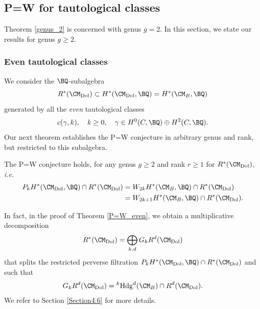 \subsection{P=W for tautological classes}
Theorem \ref{genus_2} is concerned with genus $g=2$.
In this section, we state our results for genus $g \geq  2$.
\subsubsection{Even tautological classes}
We consider the $\BQ$-subalgebra
\[
R^*(\CM_{\mathrm{Dol}})  \subset H^*(\CM_{\mathrm{Dol}}, \BQ)= H^*(\CM_B, \BQ)
\]
generated by all the \emph{even} tautological classes
\[
c(\gamma,k), \quad  k\geq 0, \quad  \gamma \in H^0(C, \BQ)\oplus H^2(C, \BQ).
\]
Our next theorem establishes the P=W conjecture in arbitrary genus and rank, but restricted to this subalgebra.
\begin{thm}
\notready\label{P=W_even}
The P=W conjecture holds, for any genus $g \geq 2$ and rank $r\geq 1$ for $R^*(\CM_{\mathrm{Dol}})$, \emph{i.e.}
\[
\begin{split}
P_kH^\ast(\CM_{\mathrm{Dol}}, \BQ) \cap R^*(\CM_{\mathrm{Dol}}) & = W_{2k}H^\ast(\CM_{B}, \BQ) \cap R^*(\CM_{\mathrm{Dol}})\\
& = W_{2k+1}H^\ast(\CM_{B}, \BQ) \cap R^*(\CM_{\mathrm{Dol}}).
\end{split}
\]
\end{thm}

In fact, in the proof of Theorem  \ref{P=W_even}, we obtain a multiplicative decomposition
\begin{equation*}
R^*(\CM_{\mathrm{Dol}}) = \bigoplus_{k,d} G_k R^d(\CM_{\mathrm{Dol}})
\end{equation*}
 that splits the restricted perverse filtration $P_kH^\ast(\CM_{\mathrm{Dol}}, \BQ) \cap R^*(\CM_{\mathrm{Dol}})$ and such that
\[
G_k R^d(\CM_{\mathrm{Dol}}) =  {^k\mathrm{Hdg}^d}(\CM_B) \cap R^{d}(\CM_{\mathrm{Dol}}).
\]
We refer to Section \ref{Section4.6} for more details.

